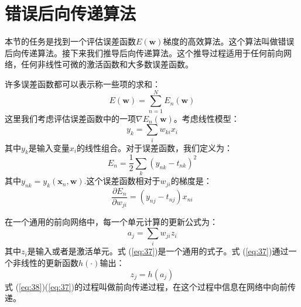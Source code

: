 \documentclass[10pt,a4paper,UTF8]{article}
\begin{document}
\section{错误后向传递算法}
\label{sec:orgebc817f}


本节的任务是找到一个评估误差函数\(E(\mathbf{w})\)梯度的高效算法。这个算法叫做错误后向传递算法。接下来我们推导后向传递算法。这个推导过程适用于任何前向网络，任何非线性可微的激活函数和大多数误差函数。

许多误差函数都可以表示称一些项的求和：
\begin{equation}
\label{eq:33}
E(\mathbf{w}) = \sum_{n=1}^{N}E_{n}(\mathbf{w})
\end{equation}
这里我们考虑评估误差函数中的一项\(\nabla E_{n}(\mathbf{w})\)。考虑线性模型：
\begin{equation}
\label{eq:34}
y_{k} = \sum_{i} w_{ki}x_{i}
\end{equation}
其中\(y_{k}\)是输入变量\(x_{i}\)的线性组合。对于误差函数，我们定义为：
\begin{equation}
\label{eq:35}
E_{n} = \frac{1}{2}\sum_{k}(y_{nk} - t_{nk})^{2}
\end{equation}
其中\(y_{nk} = y_{k}(\mathbf{x}_{n},\mathbf{w})\).这个误差函数相对于\(w_{ji}\)的梯度是：
\begin{equation}
\label{eq:36}
\frac{\partial E_{n}}{\partial w_{ji}} = (y_{nj} - t_{nj})x_{ni}
\end{equation}

在一个通用的前向网络中，每一个单元计算的更新公式为：
\begin{equation}
\label{eq:37}
a_{j} = \sum_{i}w_{ji}z_{i}
\end{equation}
其中\(z_{i}\)是输入或者是激活单元。式 (\ref{eq:37})是一个通用的式子。式 (\ref{eq:37})通过一个非线性的更新函数\(h(\cdot)\)输出：
\begin{equation}
\label{eq:38}
z_{j} = h(a_{j})
\end{equation}
式 (\ref{eq:38})(\ref{eq:37})的过程叫做前向传递过程，在这个过程中信息在网络中向前传递。
\end{document}
